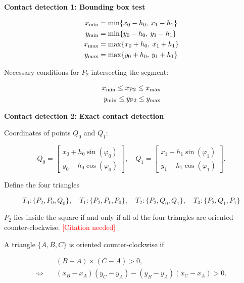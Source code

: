 \textbf{Contact detection 1: Bounding box test}

\begin{align*}
x_{\rm{min}} &= \min\{x_0 - h_0,\:x_1 - h_1\}\\
y_{\rm{min}} &= \min\{y_0 - h_0,\:y_1 - h_1\}\\
x_{\rm{max}} &= \max\{x_0 + h_0,\:x_1 + h_1\}\\
y_{\rm{max}} &= \max\{y_0 + h_0,\:y_1 + h_1\}
\end{align*}

Necessary conditions for $P_2$ intersecting the segment:

\begin{align*}
x_{\rm{min}} \le x_{\rm{P2}} \le x_{\rm{max}}\\
y_{\rm{min}} \le y_{\rm{P2}} \le y_{\rm{max}}
\end{align*}

\textbf{Contact detection 2: Exact contact detection}

Coordinates of points $Q_0$ and $Q_1$:

\begin{equation*}
Q_0 = \begin{bmatrix}
x_{0} + h_{0}\sin(\varphi_{0}) \\
y_{0} - h_{0}\cos(\varphi_{0})
\end{bmatrix},\quad
Q_1 = \begin{bmatrix}
x_{1} + h_{1}\sin(\varphi_{1}) \\
y_{1} - h_{1}\cos(\varphi_{1})
\end{bmatrix}.
\end{equation*}

Define the four triangles

\begin{equation*}
T_{0} : \{ P_2, P_0, Q_0 \},\quad T_{1} : \{ P_2, P_1, P_0 \},\quad T_{2} : \{ P_2, Q_0, Q_1 \},\quad T_{3} : \{ P_2, Q_1, P_1 \}
\end{equation*}

$P_2$ lies inside the square if and only if all of the four triangles are oriented counter-clockwise. \textcolor{red}{[Citation needed]} %

A triangle $\{A, B, C\}$ is oriented counter-clockwise if

\begin{align*}
&(B-A)\times(C-A) > 0,\\
\Leftrightarrow\quad &(x_B-x_A)(y_C-y_A)-(y_B-y_A)(x_C-x_A) > 0.
\end{align*}

